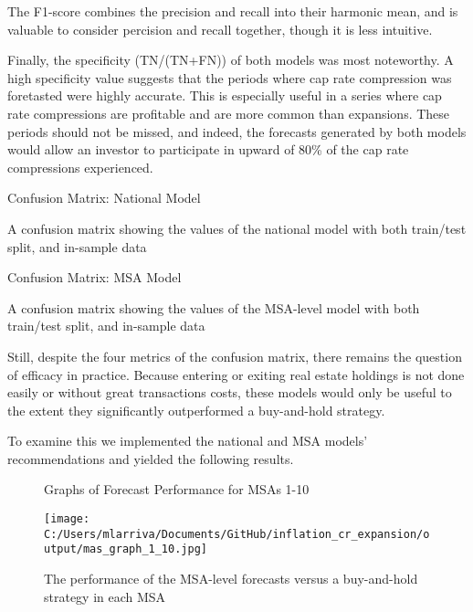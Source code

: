 The F1-score combines the precision and recall into their harmonic mean, and is valuable to consider percision and recall together, though it is less intuitive. 

Finally, the specificity (TN/(TN+FN)) of both models was most noteworthy. A high specificity value suggests that the periods where cap rate compression was foretasted were highly accurate. This is especially useful in a series where cap rate compressions are profitable and are more common than expansions. These periods should not be missed, and indeed, the forecasts generated by both models would allow an investor to participate in upward of 80\% of the cap rate compressions experienced.

\pagebreak

\begin{table}[H]
\centering
\caption*{Confusion Matrix: National Model}
\caption{A confusion matrix showing the values of the national model with both train/test split, and in-sample data}
\end{table}

\begin{table}[H]
\centering
\caption*{Confusion Matrix: MSA Model}
\caption{A confusion matrix showing the values of the MSA-level model with both train/test split, and in-sample data}
\end{table}

Still, despite the four metrics of the confusion matrix, there remains the question of efficacy in practice. Because entering or exiting real estate holdings is not done easily or without great transactions costs, these models would only be useful to the extent they significantly outperformed a buy-and-hold strategy.

To examine this we implemented the national and MSA models' recommendations and yielded the following results.

\begin{figure}[H]
\hspace*{-0.25in}
\caption*{Graphs of Forecast Performance for MSAs 1-10}
\texttt{[image: C:/Users/mlarriva/Documents/GitHub/inflation\_cr\_expansion/output/mas\_graph\_1\_10.jpg]}
\caption{The performance of the MSA-level forecasts versus a buy-and-hold strategy in each MSA}
\end{figure}

